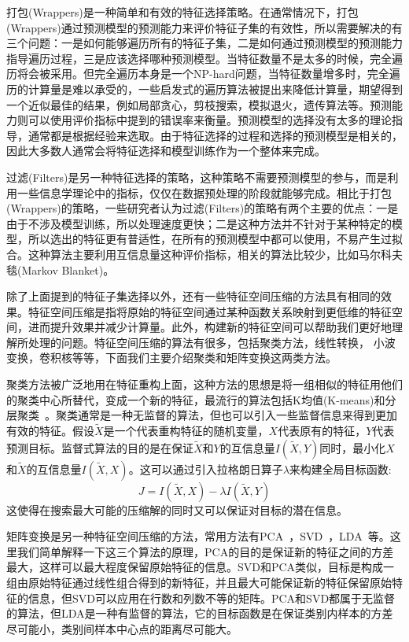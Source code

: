 打包(Wrappers)是一种简单和有效的特征选择策略。在通常情况下，打包(Wrappers)通过预测模型的预测能力来评价特征子集的有效性，所以需要解决的有三个问题：一是如何能够遍历所有的特征子集，二是如何通过预测模型的预测能力指导遍历过程，三是应该选择哪种预测模型。当特征数量不是太多的时候，完全遍历将会被采用。但完全遍历本身是一个NP-hard问题，当特征数量增多时，完全遍历的计算量是难以承受的，一些启发式的遍历算法被提出来降低计算量，期望得到一个近似最佳的结果，例如局部贪心，剪枝搜索，模拟退火，遗传算法等。预测能力则可以使用评价指标中提到的错误率来衡量。预测模型的选择没有太多的理论指导，通常都是根据经验来选取。由于特征选择的过程和选择的预测模型是相关的，因此大多数人通常会将特征选择和模型训练作为一个整体来完成。

过滤(Filters)是另一种特征选择的策略，这种策略不需要预测模型的参与，而是利用一些信息学理论中的指标，仅仅在数据预处理的阶段就能够完成。相比于打包(Wrappers)的策略，一些研究者认为过滤(Filters)的策略有两个主要的优点：一是由于不涉及模型训练，所以处理速度更快；二是这种方法并不针对于某种特定的模型，所以选出的特征更有普适性，在所有的预测模型中都可以使用，不易产生过拟合。这种算法主要利用互信息量这种评价指标，相关的算法比较少，比如马尔科夫毯(Markov Blanket)。

除了上面提到的特征子集选择以外，还有一些特征空间压缩的方法具有相同的效果。特征空间压缩是指将原始的特征空间通过某种函数关系映射到更低维的特征空间，进而提升效果并减少计算量。此外，构建新的特征空间可以帮助我们更好地理解所处理的问题。特征空间压缩的算法有很多，包括聚类方法，线性转换，
小波变换，卷积核等等，下面我们主要介绍聚类和矩阵变换这两类方法。

聚类方法被广泛地用在特征重构上面，这种方法的思想是将一组相似的特征用他们的聚类中心所替代，变成一个新的特征，最流行的算法包括K均值(K-means)和分层聚类~\cite{Barker1998Pattern}。聚类通常是一种无监督的算法，但也可以引入一些监督信息来得到更加有效的特征。假设$\widetilde{X}$是一个代表重构特征的随机变量，$X$代表原有的特征，$Y$代表预测目标。监督式算法的目的是在保证$\widetilde{X}$和$Y$的互信息量$I(\widetilde{X}, Y)$同时，最小化$X$和$\widetilde{X}$的互信息量$I(\widetilde{X}, X)$。这可以通过引入拉格朗日算子$\lambda$来构建全局目标函数:
\begin{equation}
\label{equ:lagrange_multiplier}
    J=I(\widetilde{X}, X) - \lambda I(\widetilde{X}, Y)
\end{equation}
这使得在搜索最大可能的压缩解的同时又可以保证对目标的潜在信息。

矩阵变换是另一种特征空间压缩的方法，常用方法有PCA~\cite{Jolliffe1986Principal}，SVD~\cite{Golub1970Singular}，LDA~\cite{Mika1999Fisher}等。这里我们简单解释一下这三个算法的原理，PCA的目的是保证新的特征之间的方差最大，这样可以最大程度保留原始特征的信息。SVD和PCA类似，目标是构成一组由原始特征通过线性组合得到的新特征，并且最大可能保证新的特征保留原始特征的信息，但SVD可以应用在行数和列数不等的矩阵。PCA和SVD都属于无监督的算法，但LDA是一种有监督的算法，它的目标函数是在保证类别内样本的方差尽可能小，类别间样本中心点的距离尽可能大。
 
